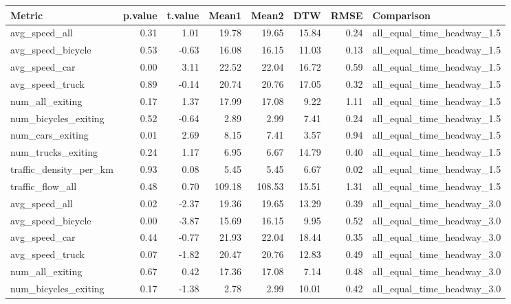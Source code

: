 \begin{table}[ht]
\centering
\begin{tabular}{lrrrrrrl}
  \hline
Metric & p.value & t.value & Mean1 & Mean2 & DTW & RMSE & Comparison \\ 
  \hline
avg\_speed\_all & 0.31 & 1.01 & 19.78 & 19.65 & 15.84 & 0.24 & all\_equal\_time\_headway\_1.5 \\ 
  avg\_speed\_bicycle & 0.53 & -0.63 & 16.08 & 16.15 & 11.03 & 0.13 & all\_equal\_time\_headway\_1.5 \\ 
  avg\_speed\_car & 0.00 & 3.11 & 22.52 & 22.04 & 16.72 & 0.59 & all\_equal\_time\_headway\_1.5 \\ 
  avg\_speed\_truck & 0.89 & -0.14 & 20.74 & 20.76 & 17.05 & 0.32 & all\_equal\_time\_headway\_1.5 \\ 
  num\_all\_exiting & 0.17 & 1.37 & 17.99 & 17.08 & 9.22 & 1.11 & all\_equal\_time\_headway\_1.5 \\ 
  num\_bicycles\_exiting & 0.52 & -0.64 & 2.89 & 2.99 & 7.41 & 0.24 & all\_equal\_time\_headway\_1.5 \\ 
  num\_cars\_exiting & 0.01 & 2.69 & 8.15 & 7.41 & 3.57 & 0.94 & all\_equal\_time\_headway\_1.5 \\ 
  num\_trucks\_exiting & 0.24 & 1.17 & 6.95 & 6.67 & 14.79 & 0.40 & all\_equal\_time\_headway\_1.5 \\ 
  traffic\_density\_per\_km & 0.93 & 0.08 & 5.45 & 5.45 & 6.67 & 0.02 & all\_equal\_time\_headway\_1.5 \\ 
  traffic\_flow\_all & 0.48 & 0.70 & 109.18 & 108.53 & 15.51 & 1.31 & all\_equal\_time\_headway\_1.5 \\ 
  avg\_speed\_all & 0.02 & -2.37 & 19.36 & 19.65 & 13.29 & 0.39 & all\_equal\_time\_headway\_3.0 \\ 
  avg\_speed\_bicycle & 0.00 & -3.87 & 15.69 & 16.15 & 9.95 & 0.52 & all\_equal\_time\_headway\_3.0 \\ 
  avg\_speed\_car & 0.44 & -0.77 & 21.93 & 22.04 & 18.44 & 0.35 & all\_equal\_time\_headway\_3.0 \\ 
  avg\_speed\_truck & 0.07 & -1.82 & 20.47 & 20.76 & 12.83 & 0.49 & all\_equal\_time\_headway\_3.0 \\ 
  num\_all\_exiting & 0.67 & 0.42 & 17.36 & 17.08 & 7.14 & 0.48 & all\_equal\_time\_headway\_3.0 \\ 
  num\_bicycles\_exiting & 0.17 & -1.38 & 2.78 & 2.99 & 10.01 & 0.42 & all\_equal\_time\_headway\_3.0 \\ 

\end{tabular}
\end{table}
